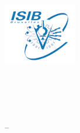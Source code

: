 
\thispagestyle{empty}

\includegraphics[scale=0.8]{ressources/isib-logo.png}
\quad
\begin{minipage}[t]{7cm}
	\vspace{-7\baselineskip}
	\sffamily\large
	\textbf{\ecole\\\entite\\\etude}
	\bigskip\\
	\entiteadresse\\\entitetel{} – \entitemail
\end{minipage}

\vfill
\begin{center}
	\sffamily
	\Huge\cours
	\bigskip\\
	\Large\titre
	\bigskip\\
	\Large\sectionEtude
	\bigskip\\
	\Large\prof
\end{center}
\vfill

\begin{center}
	\Large\auteur\\
	\Large\annee
\end{center}